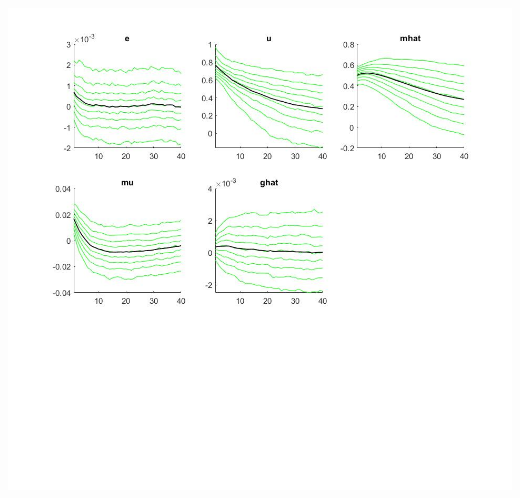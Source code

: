 \documentclass[11pt,preprint, authoryear]{elsarticle}
\let\origfigure\figure
\let\endorigfigure\endfigure
\renewenvironment{figure}[1][2] {
    \expandafter\origfigure\expandafter[H]
} {
    \endorigfigure
}
\numberwithin{equation}{section}
\numberwithin{figure}{section}
\numberwithin{table}{section}
\begin{document}
\begin{figure}
\begin{minipage}[t]{8.2cm}
        \includegraphics[width=\linewidth]{tay_fore_var2.jpg} 
    \end{minipage}
    \caption{Forecasted Variables (point) - Taylor Rule}
    \label{tay_point}
\end{figure}
\end{document}
